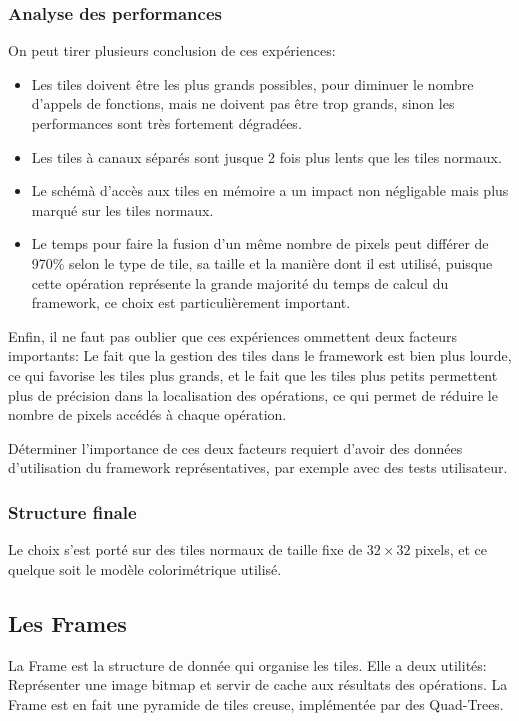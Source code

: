 		\subsubsection{Analyse des performances}
			On peut tirer plusieurs conclusion de ces expériences:
			\begin{itemize}
				\item Les tiles doivent être les plus grands possibles, pour diminuer le 
			nombre d'appels de fonctions, mais ne doivent pas être trop grands, sinon les performances sont très fortement dégradées. 
				\item Les tiles à canaux séparés sont jusque 2 fois plus lents que les tiles normaux.
				\item Le schémà d'accès aux tiles en mémoire a un impact non négligable mais plus marqué sur les tiles normaux.
				\item Le temps pour faire la fusion d'un même nombre de pixels peut différer de 970\% selon le type de tile, sa taille et la
				manière dont il est utilisé, puisque cette opération représente la grande majorité du temps de calcul du framework, ce choix
				est particulièrement important.
			\end{itemize}
			Enfin, il ne faut pas oublier que ces expériences ommettent deux facteurs importants: Le fait que la gestion des tiles dans le framework 
			est bien plus lourde, ce qui favorise les tiles plus grands, et le fait que les tiles plus petits permettent plus de précision dans 
			la localisation des opérations, ce qui permet de réduire le nombre de pixels accédés à chaque opération.

			Déterminer l'importance de ces deux facteurs requiert d'avoir des données d'utilisation du framework représentatives, par exemple
			avec des tests utilisateur. 
		\subsubsection{Structure finale}
			Le choix s'est porté sur des tiles normaux de taille fixe de $32\times32$ pixels, et ce quelque soit le modèle colorimétrique utilisé.
		\subsection{Les Frames}
			La Frame est la structure de donnée qui organise les tiles. Elle a deux utilités: Représenter une image bitmap et servir de cache aux
			résultats des opérations. La Frame est en fait une pyramide de tiles creuse, implémentée par des Quad-Trees.
